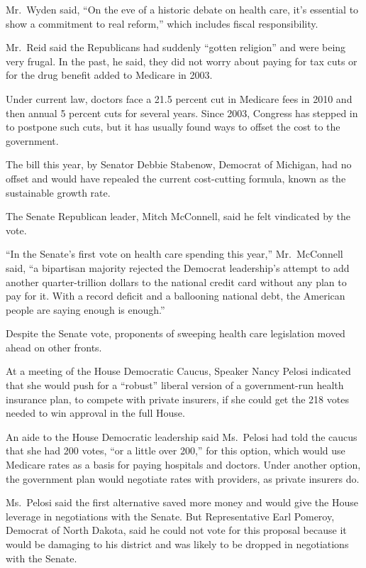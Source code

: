 ﻿\documentclass[12pt]{article}
\begin{document}
Mr.~Wyden said, ``On the eve of a historic debate on health care, it's essential to show a
commitment to real reform,'' which includes fiscal responsibility.

Mr.~Reid said the Republicans had suddenly ``gotten religion'' and were being very
frugal\cite{frugal}. In the past, he said, they did not worry about paying for tax cuts or for the
drug benefit added to Medicare in 2003.

Under current law, doctors face a 21.5 percent cut in Medicare fees in 2010 and then annual 5
percent cuts for several years. Since 2003, Congress has stepped in to postpone such cuts, but it
has usually found ways to offset the cost to the government.

The bill this year, by Senator Debbie Stabenow, Democrat of Michigan, had no offset and would have
repealed the current cost-cutting formula, known as the sustainable growth rate.

The Senate Republican leader, Mitch McConnell, said he felt vindicated by the vote.

``In the Senate's first vote on health care spending this year,'' Mr.~McConnell said, ``a bipartisan
majority rejected the Democrat leadership's attempt to add another quarter-trillion dollars to the
national credit card without any plan to pay for it. With a record deficit and a ballooning national
debt, the American people are saying enough is enough.''

Despite the Senate vote, proponents of sweeping health care legislation moved ahead on other fronts.

At a meeting of the House Democratic Caucus, Speaker Nancy Pelosi indicated that she would push for
a ``robust'' liberal version of a government-run health insurance plan, to compete with private
insurers, if she could get the 218 votes needed to win approval in the full House.

An aide to the House Democratic leadership said Ms.~Pelosi had told the caucus that she had 200
votes, ``or a little over 200,'' for this option, which would use Medicare rates as a basis for
paying hospitals and doctors. Under another option, the government plan would negotiate rates with
providers, as private insurers do.

Ms.~Pelosi said the first alternative saved more money and would give the House leverage in
negotiations with the Senate. But Representative Earl Pomeroy, Democrat of North Dakota, said he
could not vote for this proposal because it would be damaging to his district and was likely to be
dropped in negotiations with the Senate.
\end{document}
